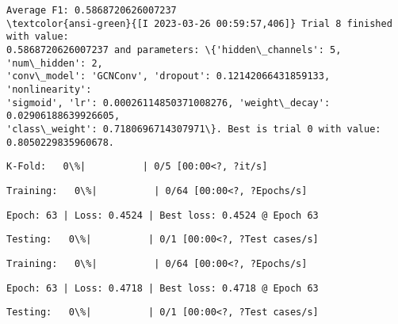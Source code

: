 \documentclass[11pt]{article}
\begin{document}
    
    \begin{Verbatim}[commandchars=\\\{\}]
Average F1: 0.5868720626007237
\textcolor{ansi-green}{[I 2023-03-26 00:59:57,406]} Trial 8 finished with value:
0.5868720626007237 and parameters: \{'hidden\_channels': 5, 'num\_hidden': 2,
'conv\_model': 'GCNConv', 'dropout': 0.12142066431859133, 'nonlinearity':
'sigmoid', 'lr': 0.00026114850371008276, 'weight\_decay': 0.02906188639926605,
'class\_weight': 0.7180696714307971\}. Best is trial 0 with value:
0.8050229835960678.
    \end{Verbatim}

    
    \begin{Verbatim}[commandchars=\\\{\}]
K-Fold:   0\%|          | 0/5 [00:00<?, ?it/s]
    \end{Verbatim}

    
    
    \begin{Verbatim}[commandchars=\\\{\}]
Training:   0\%|          | 0/64 [00:00<?, ?Epochs/s]
    \end{Verbatim}

    
    \begin{Verbatim}[commandchars=\\\{\}]
Epoch: 63 | Loss: 0.4524 | Best loss: 0.4524 @ Epoch 63
    \end{Verbatim}

    
    \begin{Verbatim}[commandchars=\\\{\}]
Testing:   0\%|          | 0/1 [00:00<?, ?Test cases/s]
    \end{Verbatim}

    
    
    \begin{Verbatim}[commandchars=\\\{\}]
Training:   0\%|          | 0/64 [00:00<?, ?Epochs/s]
    \end{Verbatim}

    
    \begin{Verbatim}[commandchars=\\\{\}]
Epoch: 63 | Loss: 0.4718 | Best loss: 0.4718 @ Epoch 63
    \end{Verbatim}

    
    \begin{Verbatim}[commandchars=\\\{\}]
Testing:   0\%|          | 0/1 [00:00<?, ?Test cases/s]
    \end{Verbatim}
\end{document}
